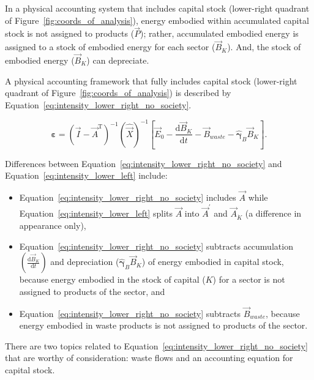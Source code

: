 In a physical accounting system that includes capital stock
(lower-right quadrant of Figure~\ref{fig:coords_of_analysis}), 
energy embodied within accumulated capital stock
is not assigned to products ($\vec{P}$); 
rather, accumulated embodied energy is assigned to a stock of embodied energy
for each sector ($\vec{B}_{K}$).
And, the stock of embodied energy ($\vec{B}_{K}$)
can depreciate.

A physical accounting framework that fully includes capital stock
(lower-right quadrant of Figure~\ref{fig:coords_of_analysis}) 
is described by Equation~\ref{eq:intensity_lower_right_no_society}. 

\begin{equation} \label{eq:intensity_lower_right_no_society}
	\boldsymbol{\varepsilon}
	= {\left( \vec{I} - {\vec{A}}^{\mathrm{T}} \right)}^{-1}
		{\left( \hat{\vec{X}}  \right)}^{-1}
		\left[ \vec{E}_{0}
			  - \frac{\mathrm{d}\vec{B}_{K}}{\mathrm{d}t}
			  - \vec{B}_{waste}
			  - \hat{\boldsymbol{\gamma}}_{B} \vec{B}_{K} \right].
\end{equation}

\noindent{}Differences between Equation~\ref{eq:intensity_lower_right_no_society}
and Equation~\ref{eq:intensity_lower_left} include:

\begin{itemize}
	\item{Equation~\ref{eq:intensity_lower_right_no_society} includes $\vec{A}$
	while Equation~\ref{eq:intensity_lower_left} splits $\vec{A}$ into
	$\vec{A}^{'}$ and $\vec{A}_{\dot{K}}$ (a difference in appearance only),}
	
	\item{Equation~\ref{eq:intensity_lower_right_no_society} subtracts
	accumulation $\left( \frac{\mathrm{d}\vec{B}_{K}}{\mathrm{d}t} \right)$
	and depreciation ($\hat{\boldsymbol{\gamma}}_{B} \vec{B}_{K}$)
	of energy embodied in capital stock,
	because energy embodied in the stock of capital ($K$)
	for a sector
	is not assigned to products of the sector, and}
	
	\item{Equation~\ref{eq:intensity_lower_right_no_society} subtracts $\vec{B}_{waste}$,
	because energy embodied in waste products is not assigned to 
	products of the sector.}
\end{itemize}

There are two topics related to Equation~\ref{eq:intensity_lower_right_no_society} 
that are worthy of consideration:
waste flows and an accounting equation for capital stock.



